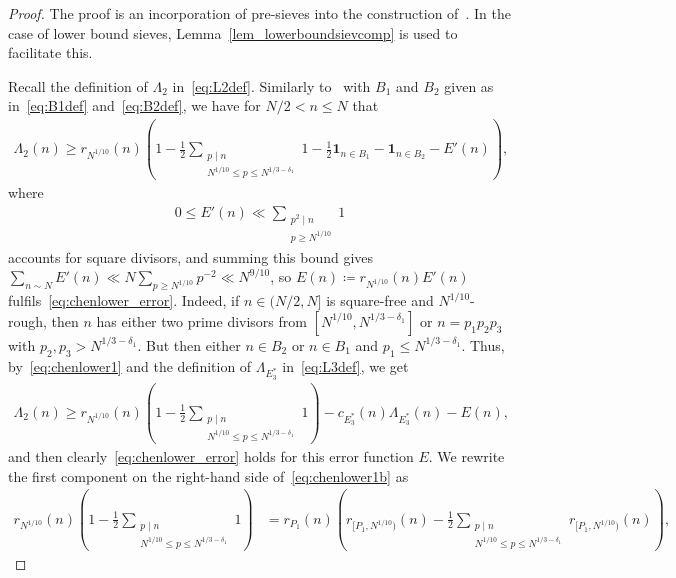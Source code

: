 \documentclass[12pt]{amsart}
\theoremstyle{definition}
\theoremstyle{remark}
\numberwithin{equation}{section}
\newcommand{\1}{\mathbf{1}}
\begin{document}
\begin{proof}
    The proof is an incorporation of pre-sieves into the construction of~\cite[Appendix A]{matomaki-shao}. In the case of lower bound sieves, Lemma~\ref{lem_lowerboundsievcomp} is used to facilitate this. 

    Recall the definition of $\Lambda_2$ in~\eqref{eq:L2def}.
    Similarly to~\cite[Appendix A.2]{matomaki-shao} with $B_1$ and $B_2$ given as in~\eqref{eq:B1def} and~\eqref{eq:B2def}, we have for $N/2 < n\leq N$ that 
    \begin{align}\label{eq:chenlower1}
        \Lambda_2(n)\geq r_{N^{1/10}}(n)\left( 1-\frac{1}{2}\sum_{\substack{p\mid n \\ N^{1/10}\leq p \leq N^{1/3-\delta_1}}}1-\frac{1}{2}\1_{n\in B_1}-\1_{n\in B_2}-E'(n)\right),
    \end{align}
    where 
    \begin{align*}
        0\leq E'(n)\ll \sum_{\substack{p^2\mid n \\ p \geq N^{1/10}}}1
    \end{align*}
    accounts for square divisors, and summing this bound gives $\sum_{n\sim N}E'(n)\ll N\sum_{p\geq N^{1/10}}p^{-2}\ll N^{9/10}$, so $E(n)\coloneqq r_{N^{1/10}}(n)E'(n)$ fulfils~\eqref{eq:chenlower_error}. Indeed, if $n\in (N/2,N]$ is square-free and $N^{1/10}$-rough, then $n$ has either two prime divisors from $[N^{1/10},N^{1/3-\delta_1}]$ or $n=p_1p_2p_3$ with $p_2,p_3>N^{1/3-\delta_1}$. But then either $n\in B_2$ or $n\in B_1$ and $p_1\leq N^{1/3-\delta_1}$. 
    Thus, by~\eqref{eq:chenlower1} and the definition of $\Lambda_{E_3^*}$ in~\eqref{eq:L3def}, we get 
    \begin{align}\label{eq:chenlower1b}
        \Lambda_2(n)\geq r_{N^{1/10}}(n)\left(1-\frac{1}{2}\sum_{\substack{p\mid n \\ N^{1/10}\leq p \leq N^{1/3-\delta_1}}}1\right)-c_{E_3^*} (n)\Lambda_{E_3^*}(n)-E(n),
    \end{align}
and then clearly~\eqref{eq:chenlower_error} holds for this error function $E$.  
    We rewrite the first component on the right-hand side of~\eqref{eq:chenlower1b} as
    \begin{align*}
         r_{N^{1/10}}(n)\left(1-\frac{1}{2}\sum_{\substack{p\mid n \\ N^{1/10}\leq p \leq N^{1/3-\delta_1}}}1\right)&=r_{P_1}(n)\left(r_{[P_1,N^{1/10})}(n)-\frac{1}{2}\sum_{\substack{p\mid n \\ N^{1/10}\leq p \leq N^{1/3-\delta_1}}}r_{[P_1,N^{1/10})}(n) \right),

\end{align*}
\end{proof}
\end{document}
